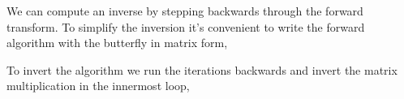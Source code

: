 \documentclass[fleqn,12pt]{article}
\newenvironment{algorithm}{\begin{quote} %
\begin{algorithmic}\samepage}{\end{algorithmic} %
\end{quote}}
\begin{document}
We can compute an inverse by stepping backwards through the forward
transform.  To simplify the inversion it's convenient to write the
forward algorithm with the butterfly in matrix form,
%
\begin{algorithm}
     \ENDFOR
  \ENDFOR
\ENDFOR
\end{algorithm}
%
To invert the algorithm we run the iterations backwards and invert the
matrix multiplication in the innermost loop,
%
\begin{algorithm}
     \ENDFOR
  \ENDFOR
\ENDFOR
\end{algorithm}
\end{document}
